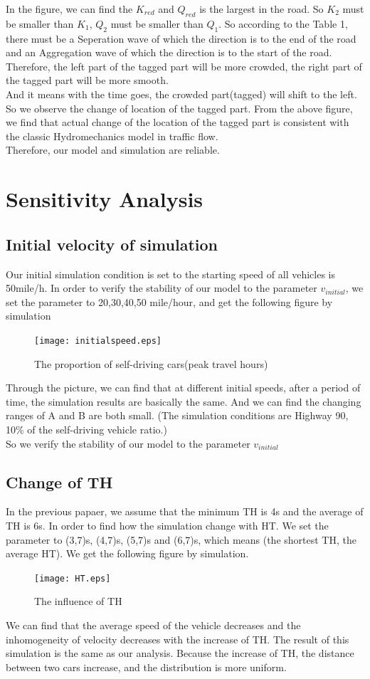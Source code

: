 \documentclass{mcmthesis}
\begin{document}
\indent In the figure, we can find the $K_{red}$ and $Q_{red}$ is the largest in the road. So $K_{2}$ must be smaller than $K_{1}$, $Q_{2}$ must be smaller than $Q_{1}$. So according to the Table 1, there must be a Seperation wave of which the direction is to the end of the road  and an Aggregation wave of which the direction is to the start of the road.\\
\indent Therefore, the left part of the tagged part will be more crowded, the right part of the tagged part will be more smooth.\\
\indent And it means with the time goes, the crowded part(tagged) will shift to the left. So we observe the change of location of the tagged part. From the above figure, we find that actual change of the location of the tagged part is consistent with the classic Hydromechanics model in traffic flow. \\
\indent Therefore, our model and simulation are reliable.


\section{Sensitivity Analysis}
\subsection{Initial velocity of simulation}
\indent Our initial simulation condition is set to the starting speed of all vehicles is 50mile/h. In order to verify the stability of our model to the parameter $v_{initial}$, we set the parameter to 20,30,40,50 mile/hour, and get the following figure by simulation
\begin{figure}[H]
	\centerline{\texttt{[image: initialspeed.eps]}}
	\caption{The proportion of self-driving cars(peak travel hours)}	
\end{figure}
\indent Through the picture, we can find that at different initial speeds, after a period of time, the simulation results are basically the same. And we can find the changing ranges of A and B are both small. (The simulation conditions are Highway 90, 10\% of the self-driving vehicle ratio.)\\
\indent So we verify the stability of our model to the parameter $v_{initial}$
\subsection{Change of TH}
\indent In the previous papaer, we assume that the minimum TH is 4s and the average of TH is 6s. In order to find how the simulation change with HT. We set the parameter to (3,7)s, (4,7)s, (5,7)s and (6,7)s, which means (the shortest TH, the average HT). We get the following figure by simulation.
\begin{figure}[H]
	\centerline{\texttt{[image: HT.eps]}}
	\caption{The influence of TH}	
\end{figure}
\indent We can find that the average speed of the vehicle decreases and the inhomogeneity of velocity decreases with the increase of TH. The result of this simulation is the same as our analysis. Because the increase of TH, the distance between two cars increase, and the distribution is more uniform.
\end{document}
